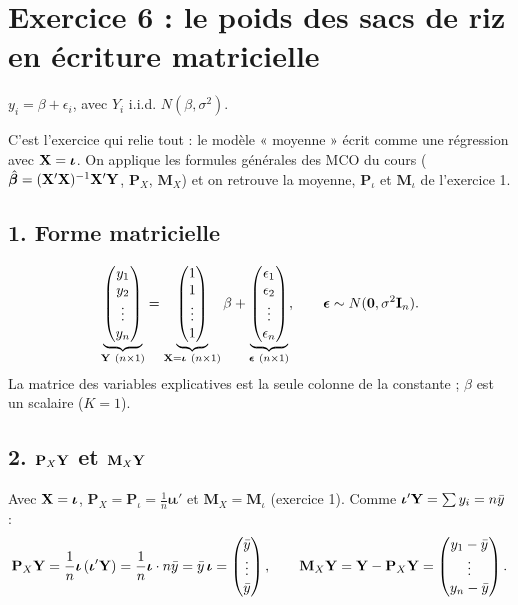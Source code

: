 \documentclass[11pt,a4paper]{article}
\newcommand{\vi}{\bm{\iota}}
\newcommand{\veps}{\bm{\epsilon}}\newcommand{\ve}{\mathbf{e}}\newcommand{\vx}{\mathbf{x}}
\newcommand{\I}{\mathbf{I}}\newcommand{\J}{\mathbf{J}}
\newcommand{\Pm}{\mathbf{P}}\newcommand{\Mm}{\mathbf{M}}
\begin{document}
\section{Exercice 6 : le poids des sacs de riz en écriture matricielle}

$y_i=\beta+\epsilon_i$, avec $Y_i$ i.i.d. $N(\beta,\sigma^2)$.

\begin{idee}
C'est l'exercice qui relie tout : le modèle « moyenne » écrit comme une régression avec $\vX=\vi$. On applique les formules générales des MCO du cours ($\hat{\bm\beta}=(\mathbf{X}'\mathbf{X})^{-1}\mathbf{X}'\mathbf{Y}$, $\Pm_X$, $\Mm_X$) et on retrouve la moyenne, $\Pm_\iota$ et $\Mm_\iota$ de l'exercice 1.
\end{idee}

\subsection*{1. Forme matricielle}
\[
\underbrace{\begin{pmatrix}y_1\\y_2\\\vdots\\y_n\end{pmatrix}}_{\vY\ (n\times1)}
=\underbrace{\begin{pmatrix}1\\1\\\vdots\\1\end{pmatrix}}_{\vX=\vi\ (n\times1)}\beta
+\underbrace{\begin{pmatrix}\epsilon_1\\\epsilon_2\\\vdots\\\epsilon_n\end{pmatrix}}_{\veps\ (n\times1)},
\qquad \veps\sim N(\mathbf 0,\sigma^2\I_n).
\]
La matrice des variables explicatives est la seule colonne de la constante ; $\beta$ est un scalaire ($K=1$).

\subsection*{2. $\Pm_X\vY$ et $\Mm_X\vY$}
Avec $\vX=\vi$, $\Pm_X=\Pm_\iota=\frac1n\vi\vi'$ et $\Mm_X=\Mm_\iota$ (exercice 1). Comme $\vi'\vY=\sum y_i=n\bar y$ :
\[
\Pm_X\vY=\frac1n\vi\,(\vi'\vY)=\frac1n\vi\cdot n\bar y=\bar y\,\vi=\begin{pmatrix}\bar y\\\vdots\\\bar y\end{pmatrix},
\qquad
\Mm_X\vY=\vY-\Pm_X\vY=\begin{pmatrix}y_1-\bar y\\\vdots\\y_n-\bar y\end{pmatrix}.
\]
\end{document}
